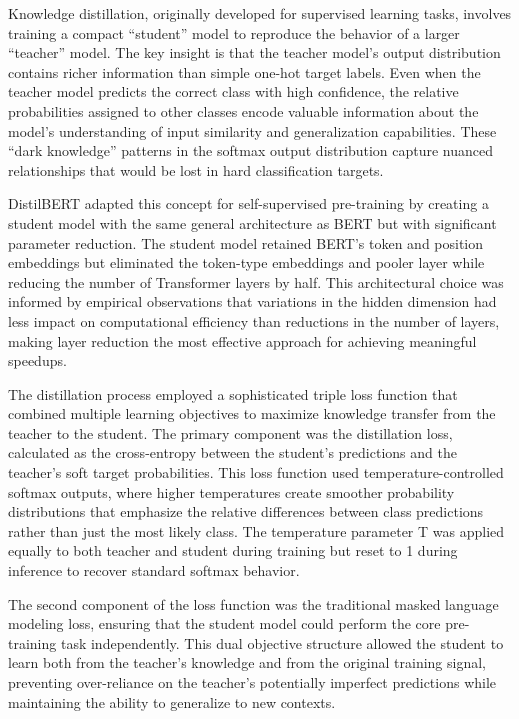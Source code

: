 \documentclass[
  titlepage]{article}
\begin{document}
Knowledge distillation, originally developed for supervised learning
tasks, involves training a compact ``student'' model to reproduce the
behavior of a larger ``teacher'' model. The key insight is that the
teacher model's output distribution contains richer information than
simple one-hot target labels. Even when the teacher model predicts the
correct class with high confidence, the relative probabilities assigned
to other classes encode valuable information about the model's
understanding of input similarity and generalization capabilities. These
``dark knowledge'' patterns in the softmax output distribution capture
nuanced relationships that would be lost in hard classification targets.

DistilBERT adapted this concept for self-supervised pre-training by
creating a student model with the same general architecture as BERT but
with significant parameter reduction. The student model retained BERT's
token and position embeddings but eliminated the token-type embeddings
and pooler layer while reducing the number of Transformer layers by
half. This architectural choice was informed by empirical observations
that variations in the hidden dimension had less impact on computational
efficiency than reductions in the number of layers, making layer
reduction the most effective approach for achieving meaningful speedups.

The distillation process employed a sophisticated triple loss function
that combined multiple learning objectives to maximize knowledge
transfer from the teacher to the student. The primary component was the
distillation loss, calculated as the cross-entropy between the student's
predictions and the teacher's soft target probabilities. This loss
function used temperature-controlled softmax outputs, where higher
temperatures create smoother probability distributions that emphasize
the relative differences between class predictions rather than just the
most likely class. The temperature parameter T was applied equally to
both teacher and student during training but reset to 1 during inference
to recover standard softmax behavior.

The second component of the loss function was the traditional masked
language modeling loss, ensuring that the student model could perform
the core pre-training task independently. This dual objective structure
allowed the student to learn both from the teacher's knowledge and from
the original training signal, preventing over-reliance on the teacher's
potentially imperfect predictions while maintaining the ability to
generalize to new contexts.
\end{document}
